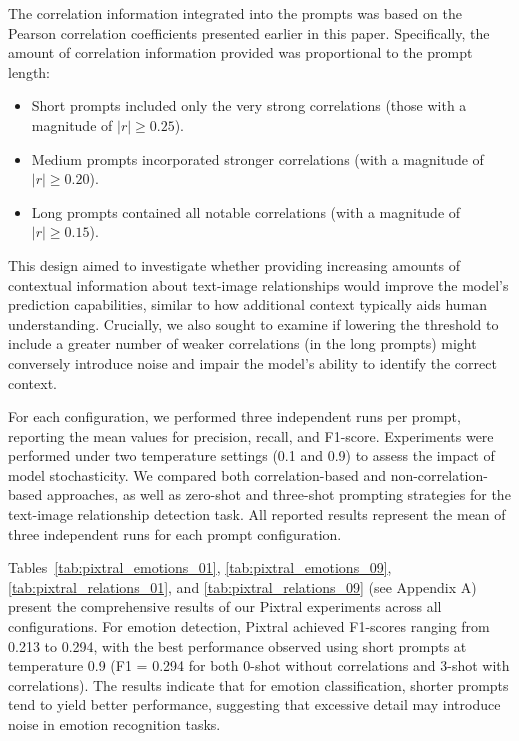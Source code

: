 \documentclass[letterpaper,journal]{IEEEtran}
\begin{document}
The correlation information integrated into the prompts was based on the Pearson correlation coefficients presented earlier in this paper. Specifically, the amount of correlation information provided was proportional to the prompt length:

\begin{itemize}
    \item Short prompts included only the very strong correlations (those with a magnitude of $|r| \ge 0.25$).
    \item Medium prompts incorporated stronger correlations (with a magnitude of $|r| \ge 0.20$).
    \item Long prompts contained all notable correlations (with a magnitude of $|r| \ge 0.15$).
\end{itemize}

This design aimed to investigate whether providing increasing amounts of contextual information about text-image relationships would improve the model's prediction capabilities, similar to how additional context typically aids human understanding. Crucially, we also sought to examine if lowering the threshold to include a greater number of weaker correlations (in the long prompts) might conversely introduce noise and impair the model's ability to identify the correct context.

For each configuration, we performed three independent runs per prompt, reporting the mean values for precision, recall, and F1-score.
Experiments were performed under two temperature settings (0.1 and 0.9) to assess the impact of model stochasticity. We compared both correlation-based and non-correlation-based approaches, as well as zero-shot and three-shot prompting strategies for the text-image relationship detection task. All reported results represent the mean of three independent runs for each prompt configuration.

Tables~\ref{tab:pixtral_emotions_01}, \ref{tab:pixtral_emotions_09}, \ref{tab:pixtral_relations_01}, and \ref{tab:pixtral_relations_09} (see Appendix A) present the comprehensive results of our Pixtral experiments across all configurations. For emotion detection, Pixtral achieved F1-scores ranging from 0.213 to 0.294, with the best performance observed using short prompts at temperature 0.9 (F1 = 0.294 for both 0-shot without correlations and 3-shot with correlations). The results indicate that for emotion classification, shorter prompts tend to yield better performance, suggesting that excessive detail may introduce noise in emotion recognition tasks.
\end{document}
